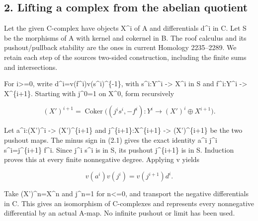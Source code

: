 \documentclass[11pt]{article}
\begin{document}
\subsection{2. Lifting a complex from the abelian quotient}\label{proofs-5910-6199-lifting-a-complex-from-the-abelian-quotient}

Let the given C-complex have objects X\^{}i of A and differentials d\^{}i in C. Let S be the morphisms of A with kernel and cokernel in B. The roof calculus and its pushout/\allowbreak{}pullback stability are the ones in current Homology 2235–\allowbreak{}2289. We retain each step of the source\textquotesingle s two-sided construction,\allowbreak{} including the finite sums and intersections.

For i>\allowbreak{}=0,\allowbreak{} write d\textasciicircum{}i\allowbreak{}=v(f\textasciicircum{}i)\allowbreak{}v(s\textasciicircum{}i)\allowbreak{}\textasciicircum{}\{-1\},\allowbreak{} with s\textasciicircum{}i:\allowbreak{}Y\textasciicircum{}i \allowbreak{}-> X\^{}i in S and f\textasciicircum{}i:\allowbreak{}Y\textasciicircum{}i \allowbreak{}-> X\textasciicircum{}\{i\allowbreak{}+1\}. Starting with j\textasciicircum{}0\allowbreak{}=1 on X\textasciicircum{}0,\allowbreak{} form recursively

\[
 (X')^{i+1}
   =\operatorname{Coker}\big((j^is^i,-f^i):
             Y^i\longrightarrow (X')^i\oplus X^{i+1}\big).
                                                        \tag{2.1}
\]

Let a\textasciicircum{}i:\allowbreak{}(X')\allowbreak{}\textasciicircum{}i \allowbreak{}-> (X')\allowbreak{}\textasciicircum{}\{i\allowbreak{}+1\} and j\textasciicircum{}\{i\allowbreak{}+1\}:\allowbreak{}X\textasciicircum{}\{i\allowbreak{}+1\} \allowbreak{}-> (X')\allowbreak{}\textasciicircum{}\{i\allowbreak{}+1\} be the two pushout maps. The minus sign in (2.1)\allowbreak{} gives the exact identity a\^{}i j\^{}i s\textasciicircum{}i\allowbreak{}=j\textasciicircum{}\{i\allowbreak{}+1\} f\^{}i. Since j\^{}i s\^{}i is in S,\allowbreak{} its pushout j\textasciicircum{}\{i\allowbreak{}+1\} is in S. Induction proves this at every finite nonnegative degree. Applying v yields

\[
 v(a^i)v(j^i)=v(j^{i+1})d^i.
\]

Take (X')\allowbreak{}\textasciicircum{}n\allowbreak{}=X\textasciicircum{}n and j\textasciicircum{}n\allowbreak{}=1 for n<\allowbreak{}=0,\allowbreak{} and transport the negative differentials in C. This gives an isomorphism of C-complexes and represents every nonnegative differential by an actual A-map. No infinite pushout or limit has been used.
\end{document}
